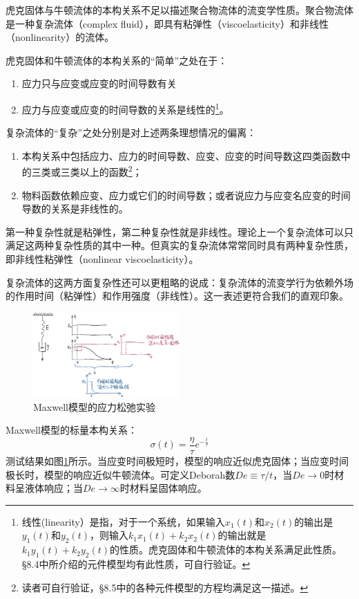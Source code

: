 \documentclass[main.tex]{subfiles}
\begin{document}
虎克固体与牛顿流体的本构关系不足以描述聚合物流体的流变学性质。聚合物流体是一种复杂流体（complex fluid），即具有粘弹性（viscoelasticity）和非线性（nonlinearity）的流体。

虎克固体和牛顿流体的本构关系的“简单”之处在于：
\begin{enumerate}
    \item 应力只与应变或应变的时间导数有关
    \item 应力与应变或应变的时间导数的关系是线性的\footnote{线性(linearity）是指，对于一个系统，如果输入\(x_1\left(t\right)\)和\(x_2\left(t\right)\)的输出是\(y_1\left(t\right)\)和\(y_2\left(t\right)\)，则输入\(k_1x_1\left(t\right)+k_2x_2\left(t\right)\)的输出就是\(k_1y_1\left(t\right)+k_2y_2\left(t\right)\)的性质。虎克固体和牛顿流体的本构关系满足此性质。\S 8.4中所介绍的元件模型均有此性质，可自行验证。}。
\end{enumerate}
复杂流体的“复杂”之处分别是对上述两条理想情况的偏离：
\begin{enumerate}
    \item 本构关系中包括应力、应力的时间导数、应变、应变的时间导数这四类函数中的三类或三类以上的函数\footnote{读者可自行验证，\S 8.5中的各种元件模型的方程均满足这一描述。}；
    \item 物料函数依赖应变、应力或它们的时间导数；或者说应力与应变名应变的时间导数的关系是非线性的。
\end{enumerate}
第一种复杂性就是粘弹性，第二种复杂性就是非线性。理论上一个复杂流体可以只满足这两种复杂性质的其中一种。但真实的复杂流体常常同时具有两种复杂性质，即非线性粘弹性（nonlinear viscoelasticity）。

复杂流体的这两方面复杂性还可以更粗略的说成：复杂流体的流变学行为依赖外场的作用时间（粘弹性）和作用强度（非线性）。这一表述更符合我们的直观印象。

\begin{figure}[h]
\centering
\includegraphics[width=0.5\textwidth]{images/I.2.1.eps}
\caption{Maxwell模型的应力松弛实验}
\label{fig:I.2.1}
\end{figure}

\begin{example}[应力松弛实验]
Maxwell模型的标量本构关系\cite[\S8.5.1,p.~240]{何曼君2007}：
\[\sigma\left(t\right)=\frac{\eta}{\tau}e^{-\frac{t}{\tau}}\]
测试结果如图\ref{fig:I.2.1}所示。当应变时间极短时，模型的响应近似虎克固体；当应变时间极长时，模型的响应近似牛顿流体。可定义Deborah数$De\equiv\tau/t$，当$De\rightarrow0$时材料呈液体响应；当$De\rightarrow\infty$时材料呈固体响应。
\end{example}
\end{document}
